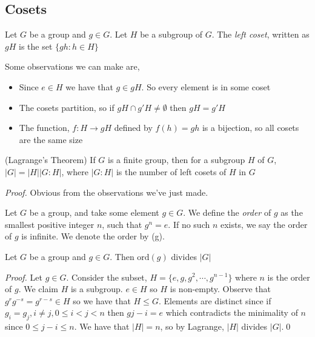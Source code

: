 \documentclass{article}
\begin{document}
\begin{itemize}
	\subsection{Cosets}
	\begin{definition}
		Let $ G $ be a group and $ g\in G $. Let $ H $ be a subgroup of $ G $. The \textit{left coset}, written as $ gH $ is the set $ \{gh : h\in H\} $
	\end{definition}
Some observations we can make are,
\begin{itemize}
	\item Since $ e\in H $ we have that $ g\in gH $. So every element is in some coset
	\item The cosets partition, so if $ gH\cap g'H\ne \emptyset $ then $ gH=g'H $
	\item The function, $ f: H\rightarrow gH $ defined by $ f(h)= gh $ is a bijection, so all cosets are the same size
\end{itemize}
\begin{theorem}
	(Lagrange's Theorem) If $ G $ is a finite group, then for a subgroup $ H $ of $ G $, $ |G|=|H||G:H| $, where $ |G:H| $ is the number of left cosets of $ H $ in $ G $
\end{theorem}
\textit{Proof.} Obvious from the observations we've just made.

\begin{definition}
	Let $ G $ be a group, and take some element $ g\in G $. We define the \textit{order} of $ g $ as the smallest positive integer $ n $, such that $ g^n = e $. If no such $ n $ exists, we say the order of $ g $ is infinite. We denote the order by (g).
\end{definition}
\begin{proposition}
	Let $ G $ be a group and $ g\in G $. Then $ \mathrm {ord}(g) $ divides $ |G| $
\end{proposition}
\textit{Proof.} Let $ g\in G $. Consider the subset, $ H=\{e, g, g^2,\cdots, g^{n-1}\} $ where $ n $ is the order of $ g $. We claim $ H $ is a subgroup. $ e\in H $ so $ H  $ is non-empty. Observe that $ g^rg^{-s}=g^{r-s}\in H $ so we have that $ H\le G $. Elements are distinct since if $ g_i=g_j, i\ne j, 0\le i<j<n $ then $ g{j-i}=e $ which contradicts the minimality of $ n $ since $ 0\le j-i\le n $. We have that $ |H|=n $, so by Lagrange, $ |H| $ divides $ |G| $.\qed

\end{itemize}
\end{document}
